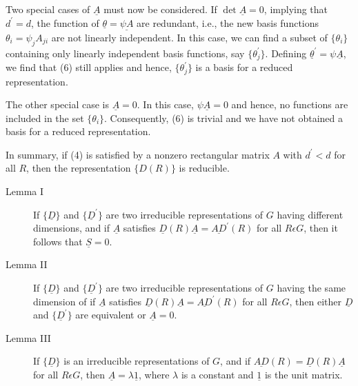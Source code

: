 Two special cases of $\underline{A}$ must now be considered.  If 
$\det \underline{A} = 0$, implying that $d^{\prime} = d$, the function 
of $\underline{\theta} = \underline{\psi A}$ are redundant, i.e., the 
new basis functions $\theta_i = \psi_jA_{ji}$ are not linearly 
independent.  In this case, we can find a subset of $\{\theta_i\}$ 
containing only linearly independent basis functions, say $\{ 
\theta^{\prime}_j\}$.  Defining $\underline{\theta}^{\prime} = \psi 
\underline{A}$, we find that (6) still applies and hence, 
$\{\theta^{\prime}_j\}$ is a basis for a reduced representation.

The other special case is $\underline{A} = 0$.  In this case, $\psi 
\underline{A} = 0$ and hence, no functions are included in the set 
$\{ \theta_i \}$.  Consequently, (6) is trivial and we have not 
obtained a basis for a reduced representation.

In summary, if (4) is satisfied by a nonzero rectangular matrix $A$ 
with $d^{\prime} < d$ for all $R$, then the representation $\{D(R)\}$ 
is reducible.

\begin{description}
\item[Lemma I]  If $\{ \underline{D} \}$ and $\{ \underline{D}^{\prime}\}$ 
are two irreducible representations of $G$ having different 
dimensions, and if $\underline{A}$ satisfies $\underline{D}(R) 
\underline{A} = \underline{AD}^{\prime}(R)$ for all $R \epsilon G$, 
then it follows that $\underline{S} = 0$.

\item[Lemma II]  If $\{ \underline{D} \}$ and $\{ \underline{D}^{\prime}\}$ 
are two irreducible representations of $G$ having the same dimension 
of if $\underline{A}$ satisfies $\underline{D}(R) 
\underline{A} = \underline{AD}^{\prime}(R)$ for all $R \epsilon G$, 
then either $\underline{D}$ and $\{ \underline{D}^{\prime}\}$ are 
equivalent or $\underline{A} = 0$.

\item[Lemma III]  If $\{ \underline{D} \}$ is an irreducible representations 
of $G$, and if $\underline{AD}(R) = \underline{D}(R) 
\underline{A}$ for all $R \epsilon G$, 
then $\underline{A} = \lambda \underline{1}$, where $\lambda$ is a 
constant and $\underline{1}$ is the unit matrix.
\end{description}

